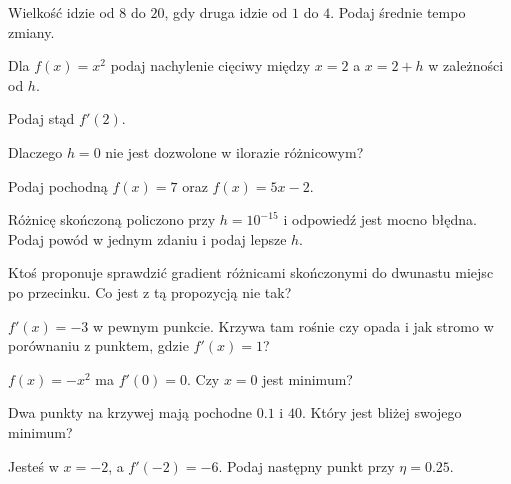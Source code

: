 \begin{testexercises}
\item Wielkość idzie od $8$ do $20$, gdy druga idzie od $1$ do $4$. Podaj
  średnie tempo zmiany.
\item Dla $f(x) = x^{2}$ podaj nachylenie cięciwy między $x = 2$ a $x = 2 + h$
  w zależności od $h$.
\item Podaj stąd $f'(2)$.
\item Dlaczego $h = 0$ nie jest dozwolone w ilorazie różnicowym?
\item Podaj pochodną $f(x) = 7$ oraz $f(x) = 5x - 2$.
\item Różnicę skończoną policzono przy $h = 10^{-15}$ i odpowiedź jest mocno
  błędna. Podaj powód w jednym zdaniu i podaj lepsze $h$.
\item Ktoś proponuje sprawdzić gradient różnicami skończonymi do dwunastu
  miejsc po przecinku. Co jest z tą propozycją nie tak?
\item $f'(x) = -3$ w pewnym punkcie. Krzywa tam rośnie czy opada i jak stromo
  w porównaniu z punktem, gdzie $f'(x) = 1$?
\item $f(x) = -x^{2}$ ma $f'(0) = 0$. Czy $x = 0$ jest minimum?
\item Dwa punkty na krzywej mają pochodne $\num{0.1}$ i $\num{40}$. Który jest
  bliżej swojego minimum?
\item Jesteś w $x = -2$, a $f'(-2) = -6$. Podaj następny punkt przy
  $\eta = \num{0.25}$.
\end{testexercises}
